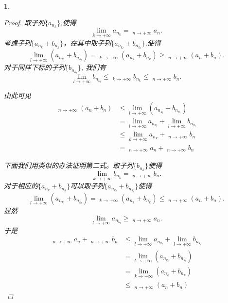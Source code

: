 \documentclass[utf8]{book}
\newtheorem{example}{}[section]             %
\DeclareMathOperator*\lowlim{\underline{lim}}
\DeclareMathOperator*\uplim{\overline{lim}}
\begin{document}
\begin{example}
\begin{enumerate}
\begin{proof}
取子列$\{a_{n_k}\}$,使得
$$\displaystyle\lim_{k\to +\infty}a_{n_k}=\displaystyle\lowlim_{n\to +\infty}a_n.$$
考虑子列$\{a_{n_k}+b_{n_k}\}$，在其中取子列$\{a_{n_{k_l}} + b_{n_{k_l}}\}$,使得
$$\displaystyle\lim_{l\to +\infty}(a_{n_{k_l}}+b_{n_{k_l}}) = \displaystyle\lowlim_{k\to +\infty}(a_{n_k} + b_{n_k}) \geq \displaystyle\lowlim_{n\to +\infty}(a_n + b_n).$$
对于同样下标的子列$\{b_{n_{k_l}}\}$, 我们有
$$\displaystyle\lim_{l\to +\infty}b_{n_{k_l}} \leq \displaystyle\uplim_{k\to +\infty}b_{n_k}\leq \displaystyle\uplim_{n\to +\infty}b_n.$$

由此可见
\begin{equation*}
\begin{split}
\displaystyle\lowlim_{n\to +\infty}(a_n + b_n) &\leq \displaystyle\lim_{l\to +\infty}(a_{n_{k_l}}+b_{n_{k_l}}) \\&= \displaystyle\lim_{l\to +\infty}a_{n_{k_l}}+\displaystyle\lim_{l\to +\infty}b_{n_{k_l}}\\&\leq \displaystyle\lim_{k\to +\infty}a_{n_k} + \displaystyle\uplim_{n\to +\infty}b_n\\&=\displaystyle\lowlim_{n\to +\infty}a_n+ \displaystyle\uplim_{n\to +\infty}b_n
\end{split}
\end{equation*}

下面我们用类似的办法证明第二式。取子列$\{b_{n_k}\}$使得
$$\displaystyle\lim_{k\to +\infty}b_{n_k} = \displaystyle\uplim_{n\to +\infty}b_n.$$
对于相应的$\{a_{n_k}+b_{n_k}\}$可以取子列$\{a_{n_{k_l}}+b_{n_{k_l}}\}$使得
$$\displaystyle\lim_{l\to +\infty}(a_{n_{k_l}}+b_{n_{k_l}}) = \displaystyle\uplim_{k\to +\infty}(a_{n_k}+b_{n_k}) \leq   \displaystyle\uplim_{n\to +\infty}(a_n+b_n).$$
显然
$$\displaystyle\lim_{l\to +\infty}a_{n_{k_l}}\geq \displaystyle\lowlim_{n\to +\infty}a_n.$$
于是
\begin{equation*}
\begin{split}
\displaystyle\lowlim_{n\to +\infty}a_n+\displaystyle\uplim_{n\to +\infty}b_n &\leq \displaystyle\lim_{l\to +\infty}a_{n_{k_l}} + \displaystyle\lim_{l\to +\infty}b_{n_{k_l}}\\&=\displaystyle\lim_{l\to +\infty}(a_{n_{k_l}}+b_{n_{k_l}}) \\&=\displaystyle\lim_{k\to +\infty}(a_{n_{k}}+b_{n_{k}}) \\&\leq \displaystyle\uplim_{n\to +\infty}(a_n+b_n)
\end{split}
\end{equation*}


\end{proof}
\end{enumerate}
\end{example}
\end{document}
